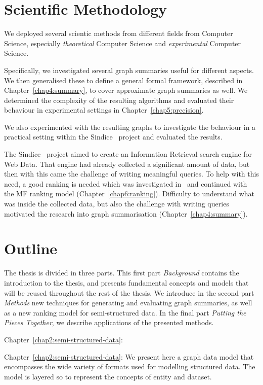 \section{Scientific Methodology}

We deployed several scientic methods from different fields from Computer Science, especially \emph{theoretical} Computer Science and \emph{experimental} Computer Science.

Specifically, we investigated several graph summaries useful for different aspects. We then generalised these to define a general formal framework, described in Chapter~\ref{chap4:summary}, to cover approximate graph summaries as well. We determined the complexity of the resulting algorithms and evaluated their behaviour in experimental settings in Chapter~\ref{chap5:precision}.

We also experimented with the resulting graphs to investigate the behaviour in a practical setting within the Sindice~\cite{delbru:jws:entity} project and evaluated the results.

The Sindice~\cite{delbru:jws:entity} project aimed to create an Information Retrieval search engine for Web Data. That engine had already collected a significant amount of data, but then with this came the challenge of writing meaningful queries. To help with this need, a good ranking is needed which was investigated in~\cite{delbru:2010:hierarchical} and continued with the MF ranking model (Chapter~\ref{chap6:ranking}). Difficulty to understand what was inside the collected data, but also the challenge with writing queries motivated the research into graph summarisation (Chapter~\ref{chap4:summary}).

\section{Outline}

The thesis is divided in three parts. This first part \emph{Background} contains the introduction to the thesis, and presents fundamental concepts and models that will be reused throughout the rest of the thesis. We introduce in the second part \emph{Methods} new techniques for generating and evaluating graph summaries, as well as a new ranking model for semi-structured data. In the final part \emph{Putting the Pieces Together}, we describe applications of the presented methods.


\begin{labeling}{Chapter~\ref{chap2:semi-structured-data}:}
\item[Chapter~\ref{chap2:semi-structured-data}:] We present here a graph data model that encompasses the wide variety of formats used for modelling structured data. The model is layered so to represent the concepts of entity and dataset.%
\end{labeling}

